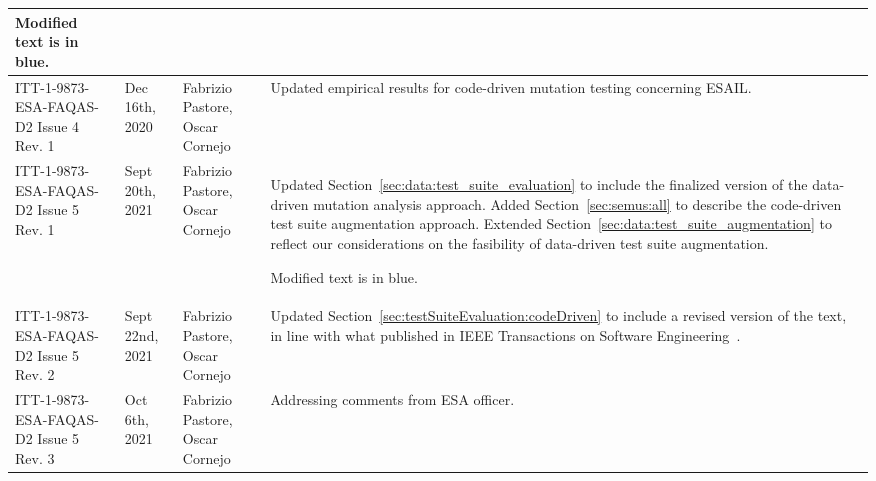 \begin{longtable}{|p{2cm}|p{1cm}|p{1.5cm}|p{9cm}|@{}}
\begin{minipage}{8cm}
Modified text is in blue.
\end{minipage}

\\
\hline


ITT-1-9873-ESA-FAQAS-D2
Issue 4 Rev. 1
&Dec 16th, 2020
&Fabrizio Pastore, Oscar Cornejo
&
\begin{minipage}{8cm}
Updated empirical results for code-driven mutation testing concerning ESAIL.
\end{minipage}
\\

\hline

ITT-1-9873-ESA-FAQAS-D2
Issue 5 Rev. 1
&Sept 20th, 2021
&Fabrizio Pastore, Oscar Cornejo
&
\begin{minipage}{8cm}
Updated Section~\ref{sec:data:test_suite_evaluation} to include the finalized version of the data-driven mutation analysis approach.
Added Section~\ref{sec:semus:all} to describe the code-driven test suite augmentation approach.
Extended Section~\ref{sec:data:test_suite_augmentation} to reflect our considerations on the fasibility of data-driven test suite augmentation.

Modified text is in blue.
\end{minipage}
\\
\hline

ITT-1-9873-ESA-FAQAS-D2
Issue 5 Rev. 2
&Sept 22nd, 2021
&Fabrizio Pastore, Oscar Cornejo
&
\begin{minipage}{8cm}
Updated Section~\ref{sec:testSuiteEvaluation:codeDriven} to include a revised version of the text, in line with what published in IEEE Transactions on Software Engineering~\cite{Oscar:TSE}.
\end{minipage}
\\

ITT-1-9873-ESA-FAQAS-D2
Issue 5 Rev. 3
&Oct 6th, 2021
&Fabrizio Pastore, Oscar Cornejo
&
\begin{minipage}{8cm}
Addressing comments from ESA officer.
\end{minipage}
\\


\hline
                                                    
\end{longtable}
\normalsize

\clearpage